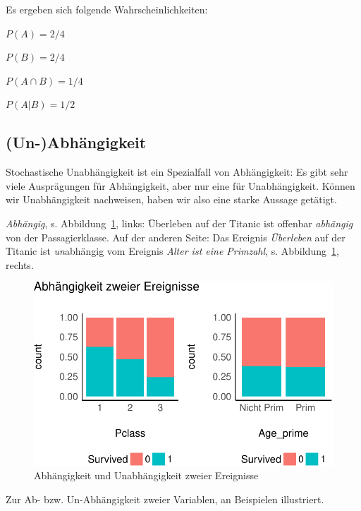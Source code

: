 \documentclass[
  a4paper,
  DIV=11]{scrreprt}
\theoremstyle{definition}
\theoremstyle{remark}
\begin{document}
Es ergeben sich folgende Wahrscheinlichkeiten:

\(P(A) = 2/4\)

\(P(B) = 2/4\)

\(P(A \cap B) = 1/4\)

\(P(A|B) = 1/2\)

\hypertarget{un-abhuxe4ngigkeit}{%
\subsection{(Un-)Abhängigkeit}\label{un-abhuxe4ngigkeit}}

Stochastische Unabhängigkeit ist ein Spezialfall von Abhängigkeit: Es
gibt sehr viele Ausprägungen für Abhängigkeit, aber nur eine für
Unabhängigkeit. Können wir Unabhängigkeit nachweisen, haben wir also
eine starke Aussage getätigt.

\emph{Abhängig}, s. Abbildung~\ref{fig-abh}, links: Überleben auf der
Titanic ist offenbar \emph{abhängig} von der Passagierklasse. Auf der
anderen Seite: Das Ereignis \emph{Überleben} auf der Titanic ist
\emph{un}abhängig vom Ereignis \emph{Alter ist eine Primzahl}, s.
Abbildung~\ref{fig-abh}, rechts.

\begin{figure}

{\centering \includegraphics[width=1\textwidth,height=\textheight]{./Wskt_files/figure-pdf/fig-abh-1.pdf}

}

\caption{\label{fig-abh}Abhängigkeit und Unabhängigkeit zweier
Ereignisse}

\end{figure}

Zur Ab- bzw. Un-Abhängigkeit zweier Variablen, an Beispielen
illustriert.
\end{document}
